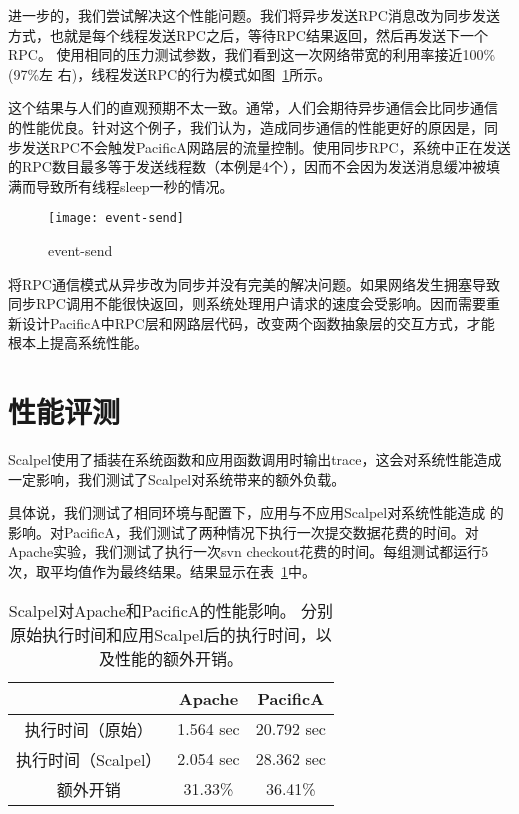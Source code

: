进一步的，我们尝试解决这个性能问题。我们将异步发送RPC消息改为同步发送
方式，也就是每个线程发送RPC之后，等待RPC结果返回，然后再发送下一个RPC。
使用相同的压力测试参数，我们看到这一次网络带宽的利用率接近100\%(97\%左
右)，线程发送RPC的行为模式如图~\ref{fig:event-send}所示。

这个结果与人们的直观预期不太一致。通常，人们会期待异步通信会比同步通信
的性能优良。针对这个例子，我们认为，造成同步通信的性能更好的原因是，同
步发送RPC不会触发PacificA网路层的流量控制。使用同步RPC，系统中正在发送
的RPC数目最多等于发送线程数（本例是4个），因而不会因为发送消息缓冲被填
满而导致所有线程sleep一秒的情况。

\begin{figure}
  \centering
  \begin{minipage}{0.8\linewidth}
    \centering
    \texttt{[image: event-send]}
    \caption{event-send}
    \label{fig:event-send}
  \end{minipage}
\end{figure}

将RPC通信模式从异步改为同步并没有完美的解决问题。如果网络发生拥塞导致
同步RPC调用不能很快返回，则系统处理用户请求的速度会受影响。因而需要重
新设计PacificA中RPC层和网路层代码，改变两个函数抽象层的交互方式，才能
根本上提高系统性能。


\section{性能评测}

Scalpel使用了插装在系统函数和应用函数调用时输出trace，这会对系统性能造成
一定影响，我们测试了Scalpel对系统带来的额外负载。

具体说，我们测试了相同环境与配置下，应用与不应用Scalpel对系统性能造成
的影响。对PacificA，我们测试了两种情况下执行一次提交数据花费的时间。对
Apache实验，我们测试了执行一次svn checkout花费的时间。每组测试都运行5
次，取平均值作为最终结果。结果显示在表~\ref{fig:perf}中。

\begin{table}[t!]
\small
\centering
\begin{minipage}{0.8\linewidth}
\centering
\caption{Scalpel对Apache和PacificA的性能影响。
分别原始执行时间和应用Scalpel后的执行时间，以及性能的额外开销。}
\label{fig:perf}
\begin{tabular}{ccc}

\toprule[1.5pt]
  		& Apache	& PacificA \\
\midrule[1pt]
执行时间（原始）& 1.564 sec	& 20.792 sec \\
执行时间（Scalpel）& 2.054 sec	& 28.362 sec \\
额外开销	& 31.33\%       & 36.41\% \\
\bottomrule[1.5pt]
\end{tabular}
\end{minipage}
\end{table}

